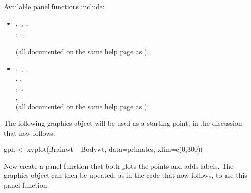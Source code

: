 Available panel functions include:
\begin{itemize}
\item {}
  ,\, ,\,
  ,\,\\  ,
  ,\, , \,\\
  \,\\ (all documented on the same help
  page as );
\item {},\, ,\,
, \,\\  ,
,\,\\  ,\,
 ,\\
, \, \\
(all
documented on the same help page as ).
\end{itemize}

The following graphics object  will be used as a starting
point, in the discussion that now follows:
\begin{Schunk}
\begin{Sinput}
gph <- xyplot(Brainwt ~ Bodywt,  data=primates,
              xlim=c(0,300))
\end{Sinput}
\end{Schunk}

Now create a panel function that both plots the points and adds
labels. The graphics object can then be updated, as in the code that
now follows, to use this panel function:

